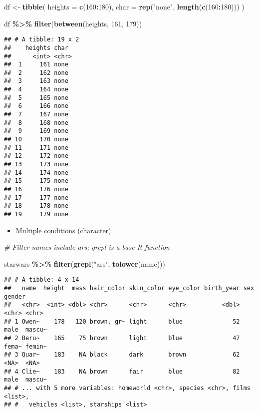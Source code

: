\documentclass[
]{book}
\newenvironment{Shaded}{\begin{snugshade}}{\end{snugshade}}
\newcommand{\CommentTok}[1]{\textcolor[rgb]{0.56,0.35,0.01}{\textit{#1}}}
\newcommand{\DataTypeTok}[1]{\textcolor[rgb]{0.13,0.29,0.53}{#1}}
\newcommand{\DecValTok}[1]{\textcolor[rgb]{0.00,0.00,0.81}{#1}}
\newcommand{\KeywordTok}[1]{\textcolor[rgb]{0.13,0.29,0.53}{\textbf{#1}}}
\newcommand{\NormalTok}[1]{#1}
\newcommand{\OperatorTok}[1]{\textcolor[rgb]{0.81,0.36,0.00}{\textbf{#1}}}
\newcommand{\StringTok}[1]{\textcolor[rgb]{0.31,0.60,0.02}{#1}}
\providecommand{\tightlist}{%
  \setlength{\itemsep}{0pt}\setlength{\parskip}{0pt}}
\begin{document}
\begin{Shaded}
\begin{Highlighting}[]
\NormalTok{df \textless{}{-}}\StringTok{ }\KeywordTok{tibble}\NormalTok{(}
  \DataTypeTok{heights =} \KeywordTok{c}\NormalTok{(}\DecValTok{160}\OperatorTok{:}\DecValTok{180}\NormalTok{),}
  \DataTypeTok{char =} \KeywordTok{rep}\NormalTok{(}\StringTok{"none"}\NormalTok{, }\KeywordTok{length}\NormalTok{(}\KeywordTok{c}\NormalTok{(}\DecValTok{160}\OperatorTok{:}\DecValTok{180}\NormalTok{)))}
\NormalTok{)}

\NormalTok{df }\OperatorTok{\%\textgreater{}\%}
\StringTok{  }\KeywordTok{filter}\NormalTok{(}\KeywordTok{between}\NormalTok{(heights, }\DecValTok{161}\NormalTok{, }\DecValTok{179}\NormalTok{))}
\end{Highlighting}
\end{Shaded}

\begin{verbatim}
## # A tibble: 19 x 2
##    heights char 
##      <int> <chr>
##  1     161 none 
##  2     162 none 
##  3     163 none 
##  4     164 none 
##  5     165 none 
##  6     166 none 
##  7     167 none 
##  8     168 none 
##  9     169 none 
## 10     170 none 
## 11     171 none 
## 12     172 none 
## 13     173 none 
## 14     174 none 
## 15     175 none 
## 16     176 none 
## 17     177 none 
## 18     178 none 
## 19     179 none
\end{verbatim}

\begin{itemize}
\tightlist
\item
  Multiple conditions (character)
\end{itemize}

\begin{Shaded}
\begin{Highlighting}[]
\CommentTok{\# Filter names include ars; \textasciigrave{}grepl\textasciigrave{} is a base R function}

\NormalTok{starwars }\OperatorTok{\%\textgreater{}\%}
\StringTok{  }\KeywordTok{filter}\NormalTok{(}\KeywordTok{grepl}\NormalTok{(}\StringTok{"ars"}\NormalTok{, }\KeywordTok{tolower}\NormalTok{(name)))}
\end{Highlighting}
\end{Shaded}

\begin{verbatim}
## # A tibble: 4 x 14
##   name  height  mass hair_color skin_color eye_color birth_year sex   gender
##   <chr>  <int> <dbl> <chr>      <chr>      <chr>          <dbl> <chr> <chr> 
## 1 Owen~    178   120 brown, gr~ light      blue              52 male  mascu~
## 2 Beru~    165    75 brown      light      blue              47 fema~ femin~
## 3 Quar~    183    NA black      dark       brown             62 <NA>  <NA>  
## 4 Clie~    183    NA brown      fair       blue              82 male  mascu~
## # ... with 5 more variables: homeworld <chr>, species <chr>, films <list>,
## #   vehicles <list>, starships <list>
\end{verbatim}
\end{document}
